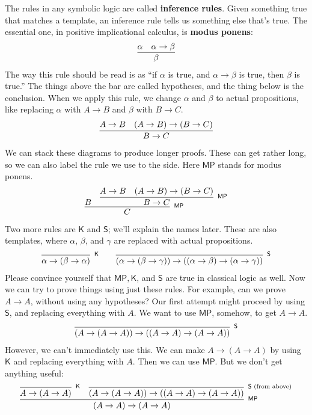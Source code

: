 \documentclass[11pt,paper=letter]{scrartcl}
\newcommand{\sf}{\mathsf}
\begin{document}
The rules in any symbolic logic are called \textbf{inference rules}. Given something true that matches a template, an inference rule tells us something else that's true. The essential one, in positive implicational calculus, is \textbf{modus ponens}:
\begin{align*}
\infer
{\beta}
{\alpha & \alpha \to \beta}
\end{align*}
The way this rule should be read is as ``if $\alpha$ is true, and $\alpha \to \beta$ is true, then $\beta$ is true.'' The things above the bar are called hypotheses, and the thing below is the conclusion. When we apply this rule, we change $\alpha$ and $\beta$ to actual propositions, like replacing $\alpha$ with $A \to B$ and $\beta$ with $B \to C$.
\begin{align*}
\infer
{B \to C}
{A \to B & (A \to B) \to (B \to C)}
\end{align*}
We can stack these diagrams to produce longer proofs. These can get rather long, so we can also label the rule we use to the side. Here $\sf{MP}$ stands for modus ponens.
\begin{align*}
\infer[^\sf{MP}]
{C}
{B &
\infer[^\sf{MP}]
{B \to C}
{A \to B & (A \to B) \to (B \to C)}}
\end{align*}
Two more rules are $\sf{K}$ and $\sf{S}$; we'll explain the names later. These are also templates, where $\alpha$, $\beta$, and $\gamma$ are replaced with actual propositions.
\begin{align*}
\infer[^\sf{K}]
{\alpha \to (\beta \to \alpha)}
{}
\qquad
\infer[^\sf{S}]
{(\alpha \to (\beta \to \gamma)) \to \left((\alpha \to \beta) \to (\alpha \to \gamma)\right)}
{}
\end{align*}
Please convince yourself that $\sf{MP}, \sf{K}$, and $\sf{S}$ are true in classical logic as well. Now we can try to prove things using just these rules. For example, can we prove $A \to A$, without using any hypotheses? Our first attempt might proceed by using $\sf{S}$, and replacing everything with $A$. We want to use $\sf{MP}$, somehow, to get $A \to A$.
\begin{align*}
\infer[^\sf{S}]
{(A \to (A \to A)) \to \left((A \to A) \to (A \to A)\right)}
{}
\end{align*}
However, we can't immediately use this. We can make $A \to (A \to A)$ by using $\sf{K}$ and replacing everything with $A$. Then we can use $\sf{MP}$. But we don't get anything useful:
\begin{align*}
\infer[^\sf{MP}]
{(A \to A) \to (A \to A)}
{
  \infer[^\sf{K}]
  {A \to (A \to A)}
  {}
  &
  \infer[^{\sf{S}\text{ (from above)}}]
  {(A \to (A \to A)) \to \left((A \to A) \to (A \to A)\right)}
  {}
}
\end{align*}
\end{document}
